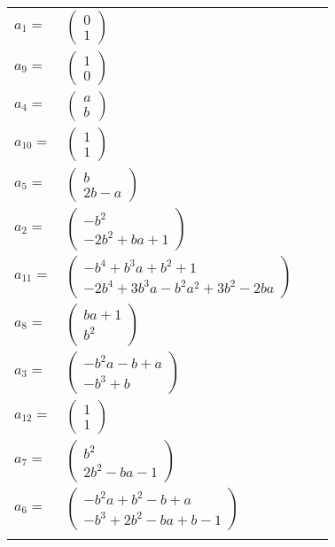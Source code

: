 \documentclass[1p]{elsarticle_modified}
\theoremstyle{definition}
\begin{document}
\begin{tabular}{m{7pt} m{180pt} m{7pt} m{180pt} }
\flushright $a_{1}=$&$\begin{pmatrix}0\\1\end{pmatrix}$ \\
\flushright $a_{9}=$&$\begin{pmatrix}1\\0\end{pmatrix}$ \\
\flushright $a_{4}=$&$\begin{pmatrix}a\\b\end{pmatrix}$ \\
\flushright $a_{10}=$&$\begin{pmatrix}1\\1\end{pmatrix}$ \\
\flushright $a_{5}=$&$\begin{pmatrix}b\\2 b- a\end{pmatrix}$ \\
\flushright $a_{2}=$&$\begin{pmatrix}- b^2\\-2 b^2+b a+1\end{pmatrix}$ \\
\flushright $a_{11}=$&$\begin{pmatrix}- b^4+b^3 a+b^2+1\\-2 b^4+3 b^3 a- b^2 a^2+3 b^2-2 b a\end{pmatrix}$ \\
\flushright $a_{8}=$&$\begin{pmatrix}b a+1\\b^2\end{pmatrix}$ \\
\flushright $a_{3}=$&$\begin{pmatrix}- b^2 a- b+a\\- b^3+b\end{pmatrix}$ \\
\flushright $a_{12}=$&$\begin{pmatrix}1\\1\end{pmatrix}$ \\
\flushright $a_{7}=$&$\begin{pmatrix}b^2\\2 b^2- b a-1\end{pmatrix}$ \\
\flushright $a_{6}=$&$\begin{pmatrix}- b^2 a+b^2- b+a\\- b^3+2 b^2- b a+b-1\end{pmatrix}$\\&\end{tabular}
\end{document}
